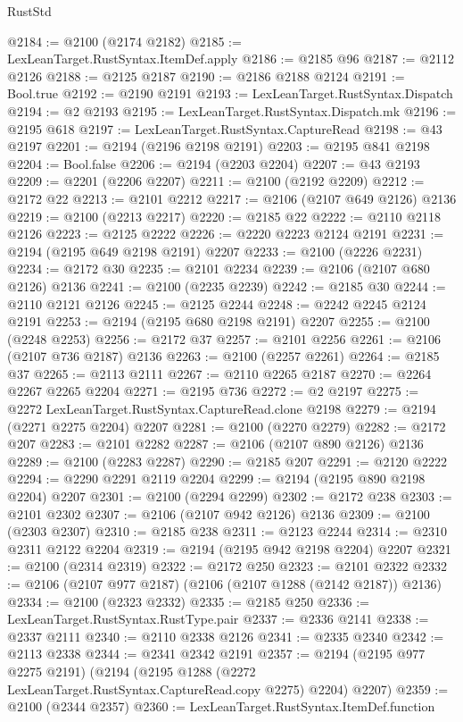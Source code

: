 \begin{lexlean}{RustStd}
\begin{coremodule}
@2184 := @2100 (@2174 @2182)
@2185 := LexLeanTarget.RustSyntax.ItemDef.apply
@2186 := @2185 @96
@2187 := @2112 @2126
@2188 := @2125 @2187
@2190 := @2186 @2188 @2124
@2191 := Bool.true
@2192 := @2190 @2191
@2193 := LexLeanTarget.RustSyntax.Dispatch
@2194 := @2 @2193
@2195 := LexLeanTarget.RustSyntax.Dispatch.mk
@2196 := @2195 @618
@2197 := LexLeanTarget.RustSyntax.CaptureRead
@2198 := @43 @2197
@2201 := @2194 (@2196 @2198 @2191)
@2203 := @2195 @841 @2198
@2204 := Bool.false
@2206 := @2194 (@2203 @2204)
@2207 := @43 @2193
@2209 := @2201 (@2206 @2207)
@2211 := @2100 (@2192 @2209)
@2212 := @2172 @22
@2213 := @2101 @2212
@2217 := @2106 (@2107 @649 @2126) @2136
@2219 := @2100 (@2213 @2217)
@2220 := @2185 @22
@2222 := @2110 @2118 @2126
@2223 := @2125 @2222
@2226 := @2220 @2223 @2124 @2191
@2231 := @2194 (@2195 @649 @2198 @2191) @2207
@2233 := @2100 (@2226 @2231)
@2234 := @2172 @30
@2235 := @2101 @2234
@2239 := @2106 (@2107 @680 @2126) @2136
@2241 := @2100 (@2235 @2239)
@2242 := @2185 @30
@2244 := @2110 @2121 @2126
@2245 := @2125 @2244
@2248 := @2242 @2245 @2124 @2191
@2253 := @2194 (@2195 @680 @2198 @2191) @2207
@2255 := @2100 (@2248 @2253)
@2256 := @2172 @37
@2257 := @2101 @2256
@2261 := @2106 (@2107 @736 @2187) @2136
@2263 := @2100 (@2257 @2261)
@2264 := @2185 @37
@2265 := @2113 @2111
@2267 := @2110 @2265 @2187
@2270 := @2264 @2267 @2265 @2204
@2271 := @2195 @736
@2272 := @2 @2197
@2275 := @2272 LexLeanTarget.RustSyntax.CaptureRead.clone @2198
@2279 := @2194 (@2271 @2275 @2204) @2207
@2281 := @2100 (@2270 @2279)
@2282 := @2172 @207
@2283 := @2101 @2282
@2287 := @2106 (@2107 @890 @2126) @2136
@2289 := @2100 (@2283 @2287)
@2290 := @2185 @207
@2291 := @2120 @2222
@2294 := @2290 @2291 @2119 @2204
@2299 := @2194 (@2195 @890 @2198 @2204) @2207
@2301 := @2100 (@2294 @2299)
@2302 := @2172 @238
@2303 := @2101 @2302
@2307 := @2106 (@2107 @942 @2126) @2136
@2309 := @2100 (@2303 @2307)
@2310 := @2185 @238
@2311 := @2123 @2244
@2314 := @2310 @2311 @2122 @2204
@2319 := @2194 (@2195 @942 @2198 @2204) @2207
@2321 := @2100 (@2314 @2319)
@2322 := @2172 @250
@2323 := @2101 @2322
@2332 := @2106 (@2107 @977 @2187) (@2106 (@2107 @1288 (@2142 @2187)) @2136)
@2334 := @2100 (@2323 @2332)
@2335 := @2185 @250
@2336 := LexLeanTarget.RustSyntax.RustType.pair
@2337 := @2336 @2141
@2338 := @2337 @2111
@2340 := @2110 @2338 @2126
@2341 := @2335 @2340
@2342 := @2113 @2338
@2344 := @2341 @2342 @2191
@2357 := @2194
    (@2195 @977 @2275 @2191)
    (@2194 (@2195 @1288 (@2272 LexLeanTarget.RustSyntax.CaptureRead.copy @2275) @2204) @2207)
@2359 := @2100 (@2344 @2357)
@2360 := LexLeanTarget.RustSyntax.ItemDef.function

\end{coremodule}
\end{lexlean}
